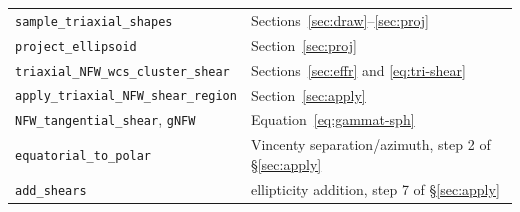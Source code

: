 \documentclass[11pt,a4paper]{article}
\begin{document}
\begin{tabular}{ll}
\verb|sample_triaxial_shapes|         & Sections~\ref{sec:draw}--\ref{sec:proj} \\
\verb|project_ellipsoid|              & Section~\ref{sec:proj} \\
\verb|triaxial_NFW_wcs_cluster_shear| & Sections~\ref{sec:effr} and \eqref{eq:tri-shear} \\
\verb|apply_triaxial_NFW_shear_region| & Section~\ref{sec:apply} \\
\verb|NFW_tangential_shear|, \verb|gNFW| & Equation~\eqref{eq:gammat-sph} \\
\verb|equatorial_to_polar|            & Vincenty separation/azimuth, step 2 of §\ref{sec:apply} \\
\verb|add_shears|                     & ellipticity addition, step 7 of §\ref{sec:apply} \\
\end{tabular}
\end{document}
